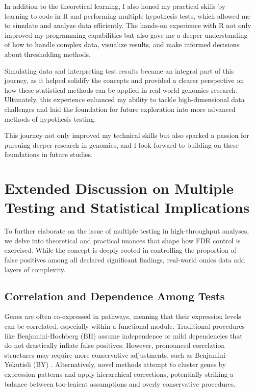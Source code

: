 \documentclass[12pt]{article}
\begin{document}
In addition to the theoretical learning, I also honed my practical skills by learning to code in R and performing multiple hypothesis tests, which allowed me to simulate and analyze data efficiently. The hands-on experience with R not only improved my programming capabilities but also gave me a deeper understanding of how to handle complex data, visualize results, and make informed decisions about thresholding methods.

Simulating data and interpreting test results became an integral part of this journey, as it helped solidify the concepts and provided a clearer perspective on how these statistical methods can be applied in real-world genomics research. Ultimately, this experience enhanced my ability to tackle high-dimensional data challenges and laid the foundation for future exploration into more advanced methods of hypothesis testing.

This journey not only improved my technical skills but also sparked a passion for pursuing deeper research in genomics, and I look forward to building on these foundations in future studies.


\section{Extended Discussion on Multiple Testing and Statistical Implications}
\label{sec:extended_multitest}

To further elaborate on the issue of multiple testing in high-throughput analyses, we delve into theoretical and practical nuances that shape how FDR control is exercised. While the concept is deeply rooted in controlling the proportion of false positives among all declared significant findings, real-world omics data add layers of complexity.

\subsection{Correlation and Dependence Among Tests}
Genes are often co-expressed in pathways, meaning that their expression levels can be correlated, especially within a functional module. Traditional procedures like Benjamini-Hochberg (BH) assume independence or mild dependencies that do not drastically inflate false positives. However, pronounced correlation structures may require more conservative adjustments, such as Benjamini-Yekutieli (BY) . Alternatively, novel methods attempt to cluster genes by expression patterns and apply hierarchical corrections, potentially striking a balance between too-lenient assumptions and overly conservative procedures.
\end{document}
